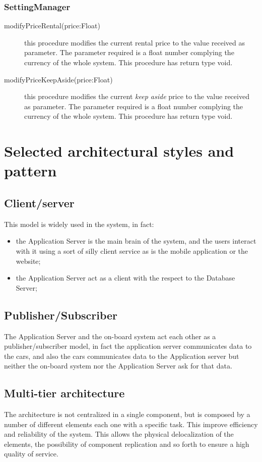 \documentclass{scrreprt}
\begin{document}
\subsubsection{SettingManager}
\begin{description}
\item[modifyPriceRental(price:Float)] this procedure modifies the current rental price to the value received as parameter. The parameter required is a float number complying the currency of the whole system. This procedure has return type void.
\item[modifyPriceKeepAside(price:Float)] this procedure modifies the current \emph{keep aside} price to the value received as parameter. The parameter required is a float number complying the currency of the whole system. This procedure has return type void.
\end{description}

\section{Selected architectural styles and pattern}
\subsection{Client/server}
This model is widely used in the system, in fact:
\begin{itemize}
\item the Application Server is the main brain of the system, and the users interact with it using a sort of silly client service as is the mobile application or the website;
\item the Application Server act as a client with the respect to the Database Server;
\end{itemize}

\subsection{Publisher/Subscriber}
The Application Server and the on-board system act each other as a publisher/subscriber model, in fact the application server communicates data to the cars, and also the cars communicates data to the Application server but neither the on-board system nor the Application Server ask for that data.


\subsection{Multi-tier architecture}
The architecture is not centralized in a single component, but is composed by a number of different elements each one with a specific task. This improve efficiency and reliability of the system. This allows the physical delocalization of the elements, the possibility of component replication and so forth to ensure a high quality of service.
\end{document}
